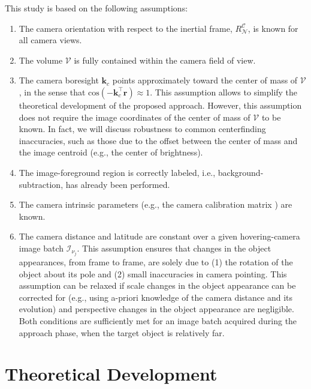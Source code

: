 This study is based on the following assumptions:

\begin{enumerate}
    \item The camera orientation with respect to the inertial frame, $R^\mathcal{C}_\mathcal{N}$, is known for all camera views. 
    \item The volume $\mathcal{V}$ is fully contained within the camera field of view.
    \item The camera boresight $\mathbf{k}_c$ points approximately toward the center of mass of $\mathcal{V}$, in the sense that $\mathrm{cos}(-\mathbf{k}^\top_c \mathbf{r}) \approx 1$. This assumption allows to simplify the theoretical development of the proposed approach. However, this assumption does not require the image coordinates of the center of mass of $\mathcal{V}$ to be known. In fact, we will discuss robustness to common centerfinding inaccuracies, such as those due to the offset between the center of mass and the image centroid (e.g., the center of brightness).
    \item The image-foreground region is correctly labeled, i.e., background-subtraction, has already been performed.
    \item The camera intrinsic parameters (e.g., the camera calibration matrix \cite{henry2023absolute}) are known.
    \item The camera distance and latitude are constant over a given hovering-camera image batch $\mathcal{I}_{\nu_j}$. This assumption ensures that changes in the object appearances, from frame to frame, are solely due to (1) the rotation of the object about its pole and (2) small inaccuracies in camera pointing. This assumption can be relaxed if scale changes in the object appearance can be corrected for (e.g., using a-priori knowledge of the camera distance and its evolution) and perspective changes in the object appearance are negligible. Both conditions are sufficiently met for an image batch acquired during the approach phase, when the target object is relatively far.
\end{enumerate}

\section{Theoretical Development}
\label{sec:theor_dev}



